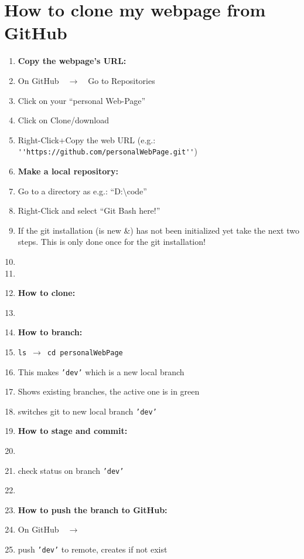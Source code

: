 \section{How to clone my webpage from GitHub}
\begin{enumerate}\packed
\item[] \textbf{Copy the webpage's URL:}
\item On GitHub~~$\longrightarrow$~~Go to Repositories
\item Click on your ``personal Web-Page''
\item Click on Clone/download
\item Right-Click+Copy the web URL  (e.g.: \verb!''https://github.com/personalWebPage.git''!)
%
\medskip
\item[] \textbf{Make a local repository:}
\item Go to a directory as e.g.: ``D:\textbackslash code''
\item Right-Click and select ``Git Bash here!''
\item If the git installation (is new \&) has not been initialized yet take the next two steps. This is only done once for the git installation!
\item[]  
\item[]  
%
\medskip
\item[] \textbf{How to clone:}
\item {}
%
\medskip
\item[] \textbf{How to branch:}
\item \texttt{ls}~$\longrightarrow$~\texttt{cd personalWebPage}
\item {}  \hfill This makes \texttt{'dev'} which is a new local branch
\item {}           \hfill Shows existing branches, the active one is in green
\item {}     \hfill switches git to new local branch \texttt{'dev'}
%
\medskip
\item[] \textbf{How to stage and commit:}
\item {}
\item {} \hfill check status on branch \texttt{'dev'}
\item {}
%
\medskip
\item[] \textbf{How to push the branch to GitHub:}
\item On GitHub~~$\longrightarrow$
\item {}   \hfill push \texttt{'dev'} to remote, creates if not exist
\end{enumerate}